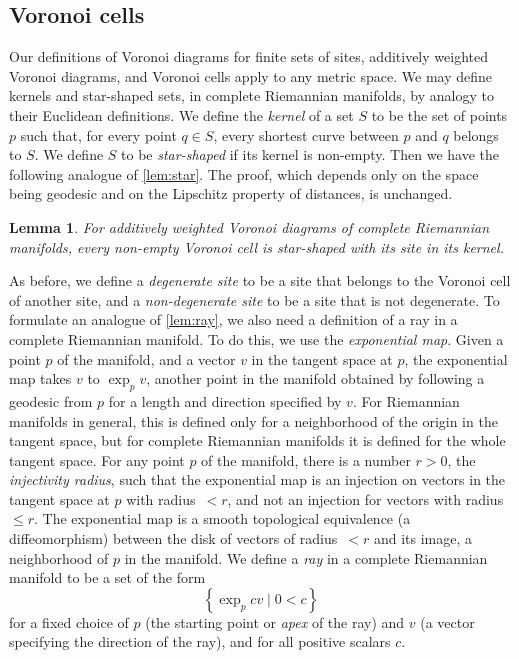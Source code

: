 \documentclass[11pt]{article}
\newtheorem{lemma}{Lemma}
\theoremstyle{definition}
\begin{document}
\iffull
\subsection{Voronoi cells}
\label{sec:riemann-vor1} 

Our definitions of Voronoi diagrams for finite sets of sites, additively weighted Voronoi diagrams, and Voronoi cells apply to any metric space. We may define kernels and star-shaped sets, in complete Riemannian manifolds, by analogy to their Euclidean definitions. We define the \emph{kernel} of a set $S$ to be the set of points $p$ such that, for every point $q\in S$, every shortest curve between $p$ and $q$ belongs to $S$. We define $S$ to be \emph{star-shaped} if its kernel is non-empty. Then we have the following analogue of \cref{lem:star}. The proof, which depends only on the space being geodesic and on the Lipschitz property of distances, is unchanged.

\begin{lemma}
\label{lem:Riemann-star}
For additively weighted Voronoi diagrams of complete Riemannian manifolds, every non-empty Voronoi cell is star-shaped with its site in its kernel.
\end{lemma}

As before, we define a \emph{degenerate site} to be a site that belongs to the Voronoi cell of another site, and a \emph{non-degenerate site} to be a site that is not degenerate. To formulate an analogue of \cref{lem:ray}, we also need a definition of a ray in a complete Riemannian manifold. To do this, we use the \emph{exponential map}. Given a point $p$ of the manifold, and a vector $v$ in the tangent space at $p$, the exponential map takes $v$ to $\exp_p v$, another point in the manifold obtained by following a geodesic from $p$ for a length and direction specified by $v$. For Riemannian manifolds in general, this is defined only for a neighborhood of the origin in the tangent space, but for complete Riemannian manifolds it is defined for the whole tangent space. For any point $p$ of the manifold, there is a number $r>0$, the \emph{injectivity radius}, such that the exponential map is an injection on vectors in the tangent space at $p$ with radius~$<r$, and not an injection for vectors with radius $\le r$. The exponential map is a smooth topological equivalence (a diffeomorphism) between the disk of vectors of radius~$<r$ and its image, a neighborhood of $p$ in the manifold. We define a \emph{ray} in a complete Riemannian manifold to be a set of the form
\[
\left\{ \exp_p cv \mid 0 < c \right\}
\]
for a fixed choice of $p$ (the starting point or \emph{apex} of the ray) and $v$ (a vector specifying the direction of the ray), and for all positive scalars $c$.
\end{document}
